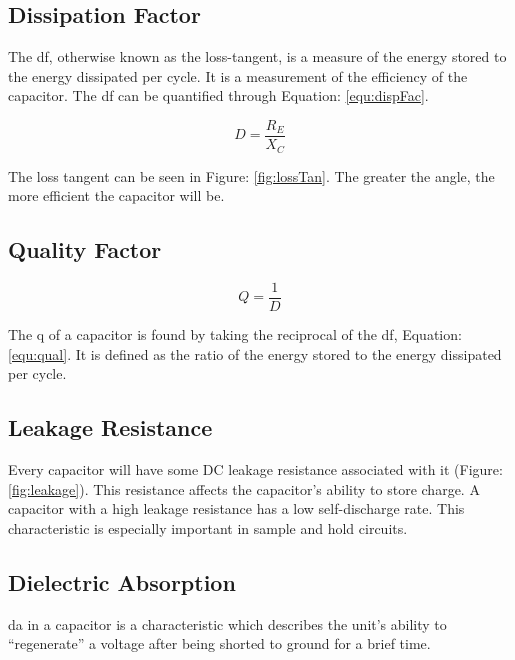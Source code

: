 \subsection{Dissipation Factor}


The \gls{df}, otherwise known as the loss-tangent, is a measure of the energy stored to the energy dissipated per cycle. It is a measurement of the efficiency of the capacitor. The \gls{df} can be quantified through Equation: \eqref{equ:dispFac}. 

\begin{equation}
\label{equ:dispFac}
D = \frac{R_E}{X_C}
\end{equation}

The loss tangent can be seen in Figure: \ref{fig:lossTan}. The greater the angle, the more efficient the capacitor will be.

\subsection{Quality Factor}

\begin{equation}
\label{equ:qual}
Q = \frac{1}{D}
\end{equation}

The \gls{q} of a capacitor is found by taking the reciprocal of the \acrlong{df}, Equation: \eqref{equ:qual}. It is defined as the ratio of the energy stored to the energy dissipated per cycle.

\subsection{Leakage Resistance}


Every capacitor will have some DC leakage resistance associated with it (Figure:\ref{fig:leakage}). This resistance affects the capacitor's ability to store charge. A capacitor with a high leakage resistance has a low self-discharge rate. This characteristic is especially important in sample and hold circuits.


\subsection{Dielectric Absorption}


\gls{da} in a capacitor is a characteristic which describes the unit's ability to ``regenerate'' a voltage after being shorted to ground for a brief time.

